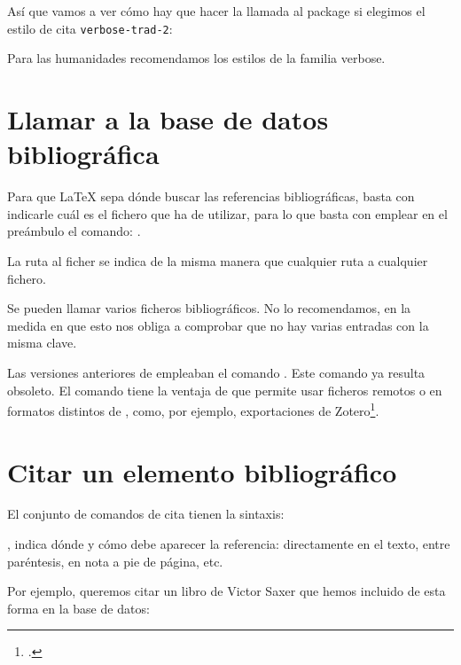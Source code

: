 Así que vamos a ver cómo hay que hacer la llamada al package si
elegimos el estilo de cita \verb|verbose-trad-2|:

\begin{latexcode}
\usepackage[citestyle=verbose-trad2]{biblatex}
\end{latexcode}

Para las humanidades recomendamos los estilos de la familia verbose.


\section{Llamar a la base de datos bibliográfica}


Para que \LaTeX{} sepa dónde buscar las referencias bibliográficas,
basta con indicarle cuál es el fichero  que ha de utilizar,
para lo que basta con emplear en el preámbulo el comando:
.

La ruta al ficher se indica de la misma manera que cualquier ruta a
cualquier fichero.

\begin{attention}
Se pueden llamar varios ficheros bibliográficos. No lo recomendamos,
en la medida en que esto nos obliga a comprobar que no hay varias
entradas con la misma clave.
\end{attention}

\begin{plusloins}
Las versiones anteriores de  empleaban el comando
. Este comando ya resulta obsoleto. El comando
 tiene la ventaja de que permite usar ficheros
remotos o en formatos distintos de , como, por ejemplo,
exportaciones de Zotero\footcite{biblatex_resources}. 
\end{plusloins}

\section{Citar un elemento bibliográfico}

El conjunto de comandos de cita tienen la sintaxis: 

,
 indica dónde y cómo debe aparecer la referencia:
directamente en el texto, entre paréntesis, en nota a pie de página, etc.

Por ejemplo, queremos citar un libro de Victor Saxer que hemos
incluido de esta forma en la base de datos:


